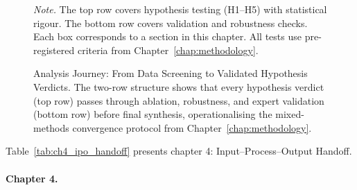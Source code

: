 \begin{figure}[!htbp]
{%
}
\caption[Analysis Journey]{Analysis Journey: From Data Screening to Validated Hypothesis Verdicts. The two-row structure shows that every hypothesis verdict (top row) passes through ablation, robustness, and expert validation (bottom row) before final synthesis, operationalising the mixed-methods convergence protocol from Chapter~\ref{chap:methodology}.}
\vspace{0.5em}\noindent\textit{Note.} The top row covers hypothesis testing (H1--H5) with statistical rigour. The bottom row covers validation and robustness checks. Each box corresponds to a section in this chapter. All tests use pre-registered criteria from Chapter~\ref{chap:methodology}.
\end{figure}

\noindent Table~\ref{tab:ch4_ipo_handoff} presents chapter 4: Input--Process--Output Handoff.

\paragraph{Chapter 4.}





